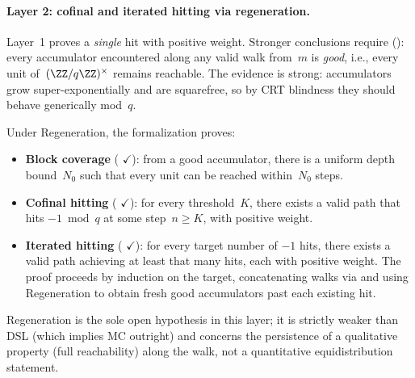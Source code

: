 \paragraph{Layer 2: cofinal and iterated hitting via regeneration.}
Layer~1 proves a \emph{single} hit with positive weight.  Stronger
conclusions require 
(): every
accumulator encountered along any valid walk from~$m$ is \emph{good},
i.e., every unit of~$(\ZZ/q\ZZ)^\times$ remains reachable.  The
evidence is strong: accumulators grow super-exponentially and are
squarefree, so by CRT blindness they should behave generically mod~$q$.

Under Regeneration, the formalization proves:
\begin{itemize}
\item \textbf{Block coverage}
(
{\color{leanink}$\checkmark$}):
from a good accumulator, there is a uniform depth bound~$N_0$ such
that every unit can be reached within~$N_0$ steps.
\item \textbf{Cofinal hitting}
(
{\color{leanink}$\checkmark$}):
for every threshold~$K$, there exists a valid path that hits
$-1\bmod q$ at some step~$n \geq K$, with positive weight.
\item \textbf{Iterated hitting}
(
{\color{leanink}$\checkmark$}):
for every target number of $-1$ hits, there exists a valid path
achieving at least that many hits, each with positive weight.
The proof proceeds by induction on the target, concatenating walks
via  and using Regeneration to obtain
fresh good accumulators past each existing hit.
\end{itemize}
Regeneration is the sole open hypothesis in this layer; it is
strictly weaker than DSL (which implies MC outright) and concerns
the persistence of a qualitative property (full reachability) along
the walk, not a quantitative equidistribution statement.

